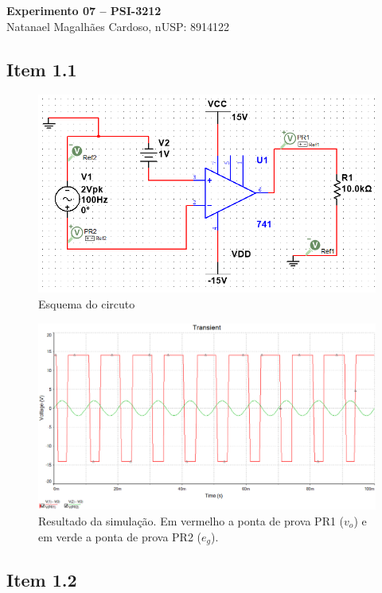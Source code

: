 \documentclass[11pt]{article}
\begin{document}
\begin{center}
  \textbf{Experimento 07 -- PSI-3212} \\
  Natanael Magalhães Cardoso, nUSP: 8914122
\end{center}

\vspace{1.8cm}

\subsection*{Item 1.1}

\begin{figure}[h!]
  \centering
  \includegraphics[width=.8\textwidth]{fig/circ1}
  \caption{Esquema do circuto}
  \label{fig:1-1-circ}
\end{figure}

\begin{figure}[h!]
  \centering
  \includegraphics[width=\textwidth]{fig/sim1}
  \caption{Resultado da simulação. Em vermelho a ponta de prova PR1 ($v_{o}$) e em verde a ponta de prova PR2 ($e_{g}$).}
  \label{fig:1-1-sim}
\end{figure}

\pagebreak

\subsection*{Item 1.2}
\end{document}
